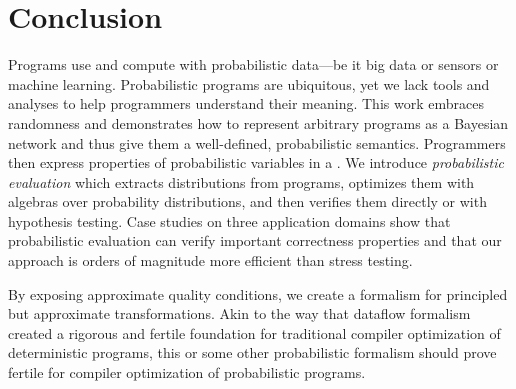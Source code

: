 
\section{Conclusion}
Programs use and compute with probabilistic data---be it big data or
sensors or machine learning.  Probabilistic programs are ubiquitous,
yet we lack tools and analyses to help programmers understand their
meaning. This work embraces randomness and demonstrates how to
represent arbitrary programs as a Bayesian network and thus give them
a well-defined, probabilistic semantics.  Programmers then express
properties of probabilistic variables in a \passert.  We introduce
\emph{probabilistic evaluation} which extracts distributions from
programs, optimizes them with algebras over probability distributions,
and then verifies them directly or with hypothesis testing.  Case
studies on three application domains show that probabilistic evaluation
can verify important correctness properties
and that our approach is orders of
magnitude more efficient than stress testing.


By exposing approximate quality conditions, we create a
formalism for principled but approximate transformations.  Akin to the
way that dataflow formalism created a rigorous and fertile foundation
for traditional compiler optimization of deterministic programs, this
or some other probabilistic formalism should prove fertile for compiler optimization
of probabilistic programs.
